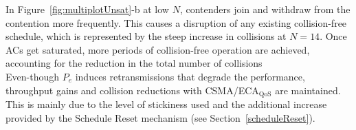 \begin{itemize}
%	
%
In Figure~\ref{fig:multiplotUnsat}-b at low $N$, contenders join and withdraw from the contention more frequently. This causes a disruption of any existing collision-free schedule, which is represented by the steep increase in collisions at $N=14$. Once ACs get saturated, more periods of collision-free operation are achieved, accounting for the reduction in the total number of collisions\\

%

Even-though $P_e$ induces retransmissions that degrade the performance, throughput gains and collision reductions with CSMA/ECA$_{\text{QoS}}$ are maintained. This is mainly due to the level of stickiness used and the additional increase provided by the Schedule Reset mechanism (see Section~\ref{scheduleReset}).


%

\end{itemize}

